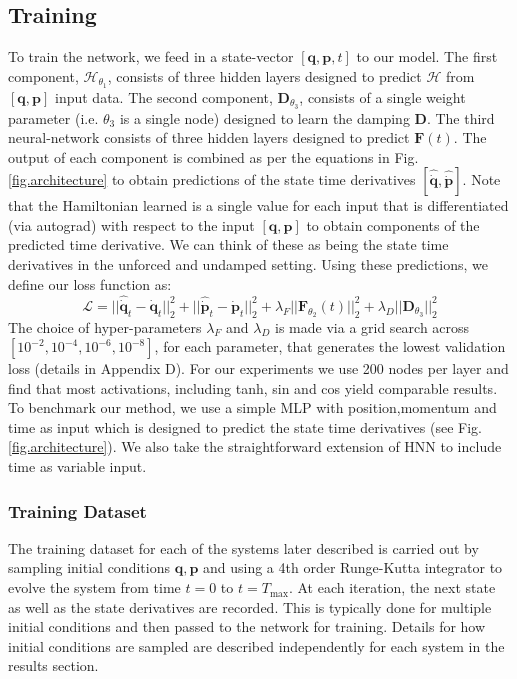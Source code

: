 \documentclass[twoside]{article}
\begin{document}
\subsection*{Training}
To train the network, we feed in a state-vector $ [\mathbf{q},\mathbf{p},t]$ to our model. The first component, $\mathcal{H}_{\theta_1}$, consists of three hidden layers designed to predict $\mathcal{H}$ from $[\mathbf{q},\mathbf{p}]$ input data. The second component, $\mathbf{D}_{\theta_3}$, consists of a single weight parameter (i.e. $\theta_3$ is a single node) designed to learn the damping $\mathbf{D}$. The third neural-network consists of three hidden layers designed to predict $\mathbf{F}(t)$. The output of each component is combined as per the equations in Fig.\ref{fig.architecture} to obtain predictions of the state time derivatives $[\hat{\dot{\mathbf{q}}},\hat{\dot{\mathbf{p}}}]$. Note that the Hamiltonian learned is a single value for each input that is differentiated (via autograd) with respect to the input $[\mathbf{q},\mathbf{p}]$ to obtain components of the predicted time derivative. We can think of these as being the state time derivatives in the unforced and undamped setting. Using these predictions, we define our loss function as:
\begin{equation}
\mathcal{L} =|| \hat{\dot{\mathbf{q}}}_t - \mathbf{\dot{q}}_t ||_2^2 +
|| \hat{\dot{\mathbf{p}}}_t -\mathbf{\dot{p}}_t ||_2^2 + \lambda_F|| \mathbf{F}_{\theta_2} (t)||_2^2 + \lambda_D||\mathbf{D}_{\theta_3}||_2^2
\label{eqn.loss}
\end{equation}
The choice of hyper-parameters $\lambda_F$ and $\lambda_D$ is made via a grid search across $[10^{-2},10^{-4},10^{-6},10^{-8}]$, for each parameter, that generates the lowest validation loss (details in Appendix D). For our experiments we use 200 nodes per layer and find that most activations, including tanh, sin and cos yield comparable results. To benchmark our method, we use a simple MLP with position,momentum and time as input which is designed to predict the state time derivatives (see Fig.\ref{fig.architecture}). We also take the straightforward extension of HNN to include time as variable input. 
\subsubsection*{Training Dataset}

The training dataset for each of the systems later described is carried out by sampling initial conditions $\mathbf{q},\mathbf{p}$ and using a 4th order Runge-Kutta integrator to evolve the system from time $t=0$ to $t=T_{\max}$. At each iteration, the next state as well as the state derivatives are recorded. This is typically done for multiple initial conditions and then passed to the network for training. Details for how initial conditions are sampled are described independently for each system in the results section.
\end{document}
